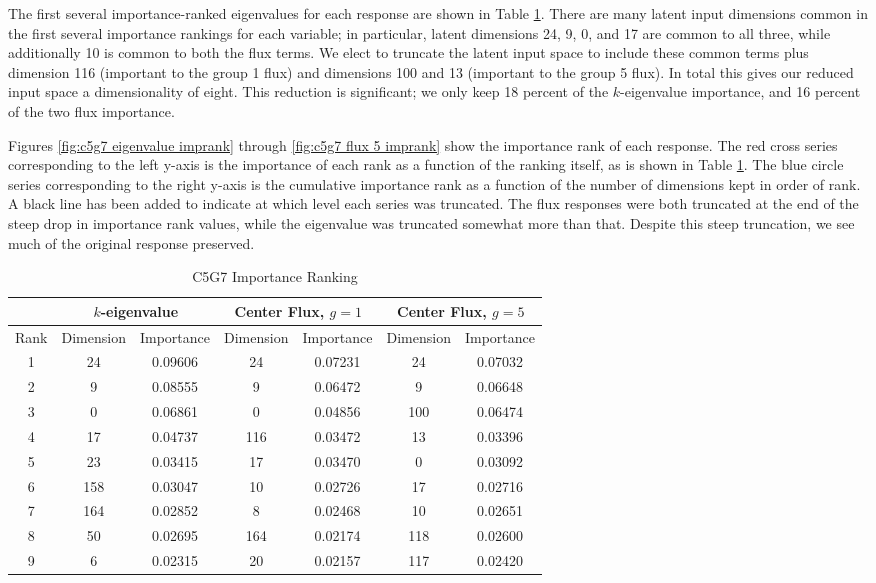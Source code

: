 The first several importance-ranked eigenvalues
for each response are shown in Table \ref{tab:c5g7 importance}.  There are many latent input dimensions common
in the first several importance rankings for each variable; in particular, latent dimensions 24, 9, 0, and 17
are common to all three, while additionally 10 is common to both the flux terms.  We elect to truncate the
latent input space to include these common terms plus dimension 116 (important to the group 1 flux) and
dimensions 100 and 13 (important to the group 5 flux).  In total this gives our reduced input space a
dimensionality of eight.  This reduction is significant; we only keep 18 percent of the $k$-eigenvalue
importance, and 16 percent of the two flux importance.  

Figures \ref{fig:c5g7 eigenvalue imprank} through
\ref{fig:c5g7 flux 5 imprank} show the importance rank of each response.  The red cross series corresponding
to the left y-axis is the importance of each rank as a function of the ranking itself, as is shown in Table
\ref{tab:c5g7 importance}.  The blue circle series corresponding to the right y-axis is the cumulative
importance rank as a function of the number of dimensions kept in order of rank.  A black line has been added
to indicate at which level each series was truncated.  The flux responses were both truncated at the end of
the steep drop in importance rank values, while the eigenvalue was truncated somewhat more than that.  Despite
this steep truncation, we see much of the original response preserved.

\begin{table}
  \centering
  \begin{tabular}{|c|c c|c c|c c|} \hline
    & \multicolumn{2}{|c|}{$k$-eigenvalue} & \multicolumn{2}{|c|}{Center Flux, $g=1$} &
             \multicolumn{2}{|c|}{Center Flux, $g=5$} \\ \hline
    Rank & Dimension & Importance & Dimension & Importance & Dimension & Importance \\ \hline 
    1 &  24 & 0.09606 &  24 & 0.07231 &  24 &  0.07032  \\
    2 &   9 & 0.08555 &   9 & 0.06472 &   9 &  0.06648  \\
    3 &   0 & 0.06861 &   0 & 0.04856 & 100 &  0.06474  \\
    4 &  17 & 0.04737 & 116 & 0.03472 &  13 &  0.03396  \\
    5 &  23 & 0.03415 &  17 & 0.03470 &   0 &  0.03092  \\
    6 & 158 & 0.03047 &  10 & 0.02726 &  17 &  0.02716  \\
    7 & 164 & 0.02852 &   8 & 0.02468 &  10 &  0.02651  \\
    8 &  50 & 0.02695 & 164 & 0.02174 & 118 &  0.02600  \\
    9 &   6 & 0.02315 &  20 & 0.02157 & 117 &  0.02420  \\
  \hline \end{tabular}
  \caption{C5G7 Importance Ranking}
  \label{tab:c5g7 importance}
\end{table}

